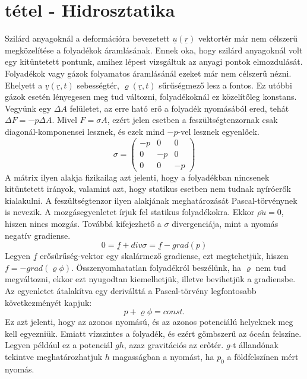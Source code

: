 \documentclass[a4paper,12pt]{article}
\begin{document}
\section{tétel - Hidrosztatika}
Szilárd anyagoknál a deformációra bevezetett $\underline{u}(\underline{r})$ vektortér már nem célszerű megközelítése a folyadékok áramlásának. Ennek oka, hogy szilárd anyagoknál volt egy kitüntetett pontunk, amihez lépest vizsgáltuk az anyagi pontok elmozdulását. Folyadékok vagy gázok folyamatos áramlásánál ezeket már nem célszerű nézni. Ehelyett a $\underline{v}(\underline{r},t)$ sebességtér, $\varrho(\underline{r},t)$ sűrűségmező lesz a fontos. Ez utóbbi gázok esetén lényegesen meg tud változni, folyadékoknál ez közelítőleg konstans.
Vegyünk egy $\Delta A$ felületet, az erre ható erő a folyadék nyomásából ered, tehát $\Delta F=-p\Delta A$. Mivel $F=\sigma A$, ezért jelen esetben a feszültségtenzornak csak diagonál-komponensei lesznek, és ezek mind $-p$-vel lesznek egyenlőek.
\begin{equation}
\sigma=\begin{pmatrix}
-p & 0 & 0 \\
0 & -p & 0 \\
0 & 0 & -p 
\end{pmatrix}
\end{equation}
A mátrix ilyen alakja fizikailag azt jelenti, hogy a folyadékban nincsenek kitüntetett irányok, valamint azt, hogy statikus esetben nem tudnak nyíróerők kialakulni. A feszültségtenzor ilyen alakjának meghatározását Pascal-törvénynek is nevezik.
A mozgásegyenletet írjuk fel statikus folyadékokra. Ekkor $\rho\ddot{u}=0$, hiszen nincs mozgás. Továbbá kifejezhető a $\sigma$ divergenciája, mint a nyomás negatív gradiense.
\begin{equation}
0=\underline{f}+div\sigma=\underline{f}-grad(p)
\end{equation} 
Legyen $\underline{f}$ erősűrűség-vektor egy skalármező gradiense, ezt megtehetjük, hiszen $f=-grad(\varrho\phi)$. Összenyomhatatlan folyadékról beszélünk, ha $\varrho$ nem tud megváltozni, ekkor ezt nyugodtan kiemelhetjük, illetve bevihetjük a gradiensbe. Az egyenletet átalakítva egy deriválttá a Pascal-törvény legfontosabb következményét kapjuk:
\begin{equation}
p+\varrho\phi=const.
\end{equation}
Ez azt jelenti, hogy az azonos nyomású, és az azonos potenciálú helyeknek meg kell egyezniük. Emiatt vízszintes a folyadék, és ezért gömbszerű az óceán felszíne.
Legyen például ez a potenciál $gh$, azaz gravitációs az erőtér. $g$-t állandónak tekintve meghatározhatjuk $h$ magasságban a nyomást, ha $p_0$ a földfelszínen mért nyomás.
\end{document}
